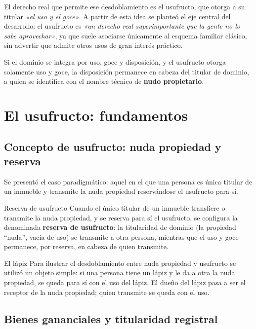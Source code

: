 \documentclass[12pt,oneside]{book}
\begin{document}
El derecho real que permite ese desdoblamiento es el usufructo, que otorga a su titular \textit{«el uso y el goce»}. A partir de esta idea se planteó el eje central del desarrollo: el usufructo es \textit{«un derecho real superimportante que la gente no lo sabe aprovechar»}, ya que suele asociarse únicamente al esquema familiar clásico, sin advertir que admite otros usos de gran interés práctico.

Si el dominio se integra por uso, goce y disposición, y el usufructo otorga solamente uso y goce, la disposición permanece en cabeza del titular de dominio, a quien se identifica con el nombre técnico de \textbf{nudo propietario}.

\chapter{El usufructo: fundamentos}

\section{Concepto de usufructo: nuda propiedad y reserva}

Se presentó el caso paradigmático: aquel en el que una persona es única titular de un inmueble y transmite la nuda propiedad reservándose el usufructo para sí.

\begin{definition}{Reserva de usufructo}
Cuando el único titular de un inmueble transfiere o transmite la nuda propiedad, y se reserva para sí el usufructo, se configura la denominada \textbf{reserva de usufructo}: la titularidad de dominio (la propiedad ``nuda'', vacía de uso) se transmite a otra persona, mientras que el uso y goce permanece, por reserva, en cabeza de quien transmite.
\end{definition}

\begin{example}{El lápiz}
Para ilustrar el desdoblamiento entre nuda propiedad y usufructo se utilizó un objeto simple: si una persona tiene un lápiz y le da a otra la nuda propiedad, se queda para sí con el uso del lápiz. El dueño del lápiz pasa a ser el receptor de la nuda propiedad; quien transmite se queda con el uso.
\end{example}

\section{Bienes gananciales y titularidad registral}
\end{document}
